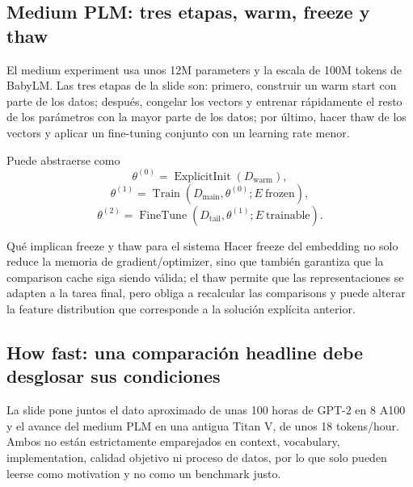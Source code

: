 \subsection{Medium PLM: tres etapas, warm, freeze y thaw}

El medium experiment usa unos 12M parameters y la escala de 100M tokens de BabyLM. Las tres etapas de la slide son: primero, construir un warm start con parte de los datos; después, congelar los vectors y entrenar rápidamente el resto de los parámetros con la mayor parte de los datos; por último, hacer thaw de los vectors y aplicar un fine-tuning conjunto con un learning rate menor.


Puede abstraerse como
\[
\theta^{(0)}=\operatorname{ExplicitInit}(D_{\text{warm}}),
\]
\[
\theta^{(1)}=\operatorname{Train}(D_{\text{main}},\theta^{(0)};E\ \text{frozen}),
\]
\[
\theta^{(2)}=\operatorname{FineTune}(D_{\text{tail}},\theta^{(1)};E\ \text{trainable}).
\]

\begin{importantbox}{Qué implican freeze y thaw para el sistema}
Hacer freeze del embedding no solo reduce la memoria de gradient/optimizer, sino que también garantiza que la comparison cache siga siendo válida; el thaw permite que las representaciones se adapten a la tarea final, pero obliga a recalcular las comparisons y puede alterar la feature distribution que corresponde a la solución explícita anterior.
\end{importantbox}


\subsection{How fast: una comparación headline debe desglosar sus condiciones}

La slide pone juntos el dato aproximado de unas 100 horas de GPT-2 en 8 A100 y el avance del medium PLM en una antigua Titan V, de unos 18 tokens/hour. Ambos no están estrictamente emparejados en context, vocabulary, implementation, calidad objetivo ni proceso de datos, por lo que solo pueden leerse como motivation y no como un benchmark justo.

